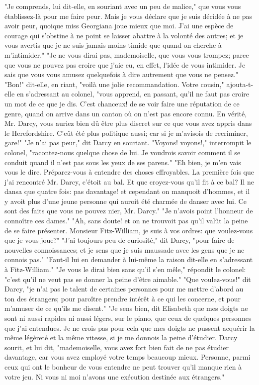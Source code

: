"Je comprends, lui dit-elle, en souriant avec un peu de malice," que vous vous établissez-là pour me faire peur. Mais je vous déclare que je suis décidée à ne pas avoir peur, quoique miss Georgiana joue mieux que moi. J'ai une espèce de courage qui s'obstine à ne point se laisser abattre à la volonté des autres; et je vous avertis que je ne suis jamais moins timide que quand on cherche à m'intimider."
"Je ne vous dirai pas, mademoiselle, que vous vous trompez; parce que vous ne pouvez pas croire que j'aie eu, en effet, l'idée de vous intimider. Je sais que vous vous amusez quelquefois à dire autrement que vous ne pensez."
\setcounter{page}{543}
"Bon!" dit-elle, en riant, "voilà une jolie recommandation. Votre cousin," ajouta-t-elle en s’adressant au colonel, "vous apprend, en passant, qu’il ne faut pas croire un mot de ce que je dis. C’est chanceux! de se voir faire une réputation de ce genre, quand on arrive dans un canton où on n’est pas encore connu. En vérité, Mr. Darcy, vous auriez bien dû être plus discret sur ce que vous avez appris dans le Herefordshire. C’eût été plus politique aussi; car si je m’avisois de recriminer, gare!"
"Je n’ai pas peur," dit Darcy en souriant.
"Voyons! voyons!," interrompit le colonel, "racontez-nous quelque chose de lui. Je voudrois savoir comment il se conduit quand il n’est pas sous les yeux de ses parens."
"Eh bien, je m’en vais vous le dire. Préparez-vous à entendre des choses effroyables. La première fois que j’ai rencontré Mr. Darcy, c’étoit au bal. Et que croyez-vous qu’il fit à ce bal? Il ne dansa que quatre fois: pas davantage! et cependant on manquoit d’hommes, et il y avoit plus d’une jeune personne qui auroit été charmée de danser avec lui. Ce sont des faits que vous ne pouvez nier, Mr. Darcy."
"Je n’avois point l’honneur de connoître ces dames."
\setcounter{page}{544}
"Ah, sans doute! et on ne trouvoit pas qu’il valût la peine de se faire présenter. Monsieur Fitz-William, je suis à vos ordres: que voulez-vous que je vous joue?"
"J’ai toujours peu de curiosité," dit Darcy, "pour faire de nouvelles connoissances; et je sens que je suis maussade avec les gens que je ne connois pas."
"Faut-il lui en demander à lui-même la raison dit-elle en s’adressant à Fitz-William."
"Je vous le dirai bien sans qu’il s’en mêle," répondit le colonel: "c’est qu’il ne veut pas se donner la peine d’être aimable."
"Que voulez-vous!" dit Darcy, "je n’ai pas le talent de certaines personnes pour me mettre d’abord au ton des étrangers; pour paroître prendre intérêt à ce qui les concerne, et pour m’amuser de ce qu’ils me disent."
"Je sens bien, dit Elisabeth que mes doigts ne sont ni aussi rapides ni aussi légers, sur le piano, que ceux de quelques personnes que j’ai entendues. Je ne crois pas pour cela que mes doigts ne pussent acquérir la même légèreté et la même vitesse, si je me donnois la peine d’étudier. Darcy sourit, et lui dit, "mademoiselle, vous avez fort bien fait de ne pas étudier davantage, car vous avez employé\setcounter{page}{545} votre temps beaucoup mieux. Personne, parmi ceux qui ont le bonheur de vous entendre ne peut trouver qu'il manque rien à votre jeu. Ni vous ni moi n'avons une exécution destinée aux étrangers."
